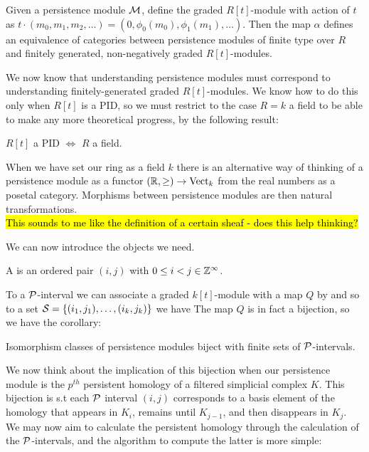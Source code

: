 \documentclass{article}
\begin{document}
\begin{theorem}
	Given a persistence module $\mathcal{M}$, define the graded $R[t]$-module 
with action of $t$ as $t \cdot (m_0, m_1, m_2, \dots) = (0, \phi_0(m_0), \phi_1(m_1), \dots )$. Then the map $\alpha$ defines an equivalence of categories between persistence modules of finite type over $R$ and finitely generated, non-negatively graded $R[t]$-modules.
\end{theorem}

We now know that understanding persistence modules must correspond to understanding finitely-generated graded $R[t]$-modules. We know how to do this only when $R[t]$ is a PID, so we must restrict to the case $R=k$ a field to be able to make any more theoretical progress, by the following result:
\begin{prop}
	$R[t]$ a PID $\Leftrightarrow$ $R$ a field. 
\end{prop}
\begin{remark}
	When we have set our ring as a field $k$ there is an alternative way of thinking of a persistence module as a functor $(\mathbb{R},\geq) \to \operatorname{Vect}_k$ from the real numbers as a posetal category. Morphisms between persistence modules are then natural transformations. \\
	\hl{This sounds to me like the definition of a certain sheaf - does this help thinking?}
	\end{remark}

 We can now introduce the objects we need. 

\begin{definition}
	A  is an ordered pair $(i,j)$ with $0 \leq i < j  \in \mathbb{Z}^\infty$.
\end{definition}

To a $\mathcal{P}$-interval we can associate a graded $k[t]$-module with a map $Q$ by 
and so to a set $\mathcal{S} = \left\{ (i_1,j_1), \dots, (i_k,j_k) \right\}$ we have 
The map $Q$ is in fact a bijection, so we have the corollary:
\begin{corollary}
	Isomorphism classes of persistence modules biject with finite sets of $\mathcal{P}$-intervals. 
\end{corollary}

We now think about the implication of this bijection when our persistence module is the $p^{th}$ persistent homology of a filtered simplicial complex $K$. This bijection is s.t each $\mathcal{P}$ interval $(i,j)$ corresponds to a basis element of the homology that appears in $K_i$, remains until $K_{j-1}$, and then disappears in $K_{j}$. \\
We may now aim to calculate the persistent homology through the calculation of the $\mathcal{P}$-intervals, and the algorithm to compute the latter is more simple: 
\vspace{3mm}
\end{document}
